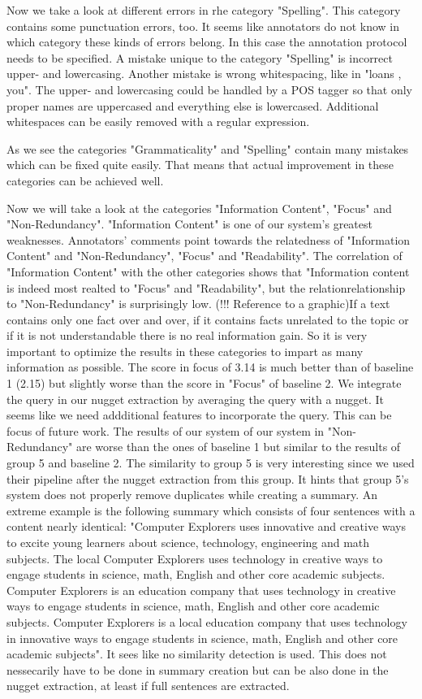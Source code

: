 Now we take a look at different errors in rhe category "Spelling". This category contains some punctuation errors, too. It seems like annotators do not know in which category these kinds of errors belong. In this case the annotation protocol needs to be specified. A mistake unique to the category "Spelling" is incorrect upper- and lowercasing. Another mistake is wrong whitespacing, like in "loans , you". The upper- and lowercasing could be handled by a POS tagger so that only proper names are uppercased and everything else is lowercased. Additional whitespaces can be easily removed with a regular expression.

As we see the categories "Grammaticality" and "Spelling" contain many mistakes which can be fixed quite easily. That means that actual improvement in these categories can be achieved well.

Now we will take a look at the categories "Information Content", "Focus" and "Non-Redundancy". "Information Content" is one of our system's greatest weaknesses. Annotators' comments point towards the relatedness of "Information Content" and "Non-Redundancy", "Focus" and "Readability". The correlation of "Information Content" with the other categories shows that "Information content is indeed most realted to "Focus" and "Readability", but the relationrelationship to "Non-Redundancy" is surprisingly low. (!!! Reference to a graphic)If a text contains only one fact over and over, if it contains facts unrelated to the topic or if it is not understandable there is no real information gain. So it is very important to optimize the results in these categories to impart as many information as possible. The score in focus of 3.14 is much better than of baseline 1 (2.15) but slightly worse than the score in "Focus" of baseline 2. We integrate the query in our nugget extraction by averaging the query with a nugget. It seems like we need addditional features to incorporate the query. This can be focus of future work. The results of our system of our system in "Non-Redundancy" are worse than the ones of baseline 1 but similar to the results of group 5 and baseline 2. The similarity to group 5 is very interesting since we used their pipeline after the nugget extraction from this group. It hints that group 5's system does not properly remove duplicates while creating a summary. An extreme example is the following summary which consists of four sentences with a content nearly identical: "Computer Explorers uses innovative and creative ways to excite young learners about science, technology, engineering and math subjects. The local Computer Explorers uses technology in creative ways to engage students in science, math, English and other core academic subjects. Computer Explorers is an education company that uses technology in creative ways to engage students in science, math, English and other core academic subjects. Computer Explorers is a local education company that uses technology in innovative ways to engage students in science, math, English and other core academic subjects". It sees like no similarity detection is used. This does not nessecarily have to be done in summary creation but can be also done in the nugget extraction, at least if full sentences are extracted.

